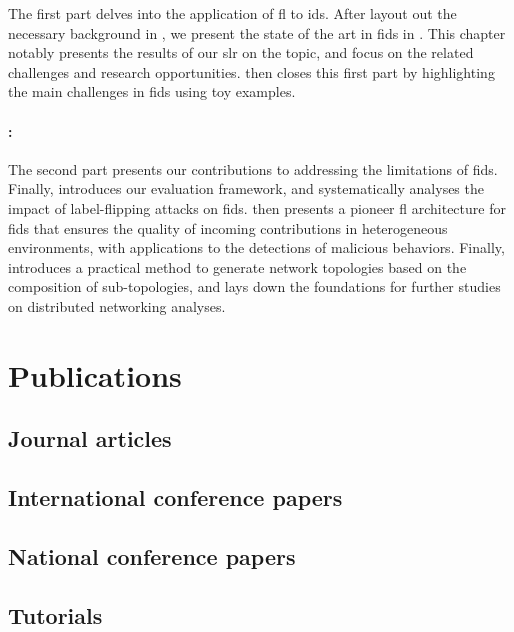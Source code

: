 The first part delves into the application of \gls{fl} to \gls{ids}.
After layout out the necessary background in , we present the state of the art in \gls{fids} in .
This chapter notably presents the results of our \gls{slr} on the topic, and focus on the related challenges and research opportunities.
 then closes this first part by highlighting the main challenges in \gls{fids} using toy examples.

\paragraph{:}

The second part presents our contributions to addressing the limitations of \gls{fids}.
Finally,  introduces our evaluation framework, and systematically analyses the impact of label-flipping attacks on \gls{fids}.
 then presents a pioneer \gls{fl} architecture for \gls{fids} that ensures the quality of incoming contributions in heterogeneous environments, with applications to the detections of malicious behaviors.
Finally,  introduces a practical method to generate network topologies based on the composition of sub-topologies, and lays down the foundations for further studies on distributed networking analyses.


\section{Publications\label{sec:intro.publications}}

\makeatletter
\newcommand\Setmaxbibnames[1]{\renewcommand\blx@maxbibnames{#1}}
\makeatletter

\begin{refsection}
  \begin{refcontext}[sorting=ymdnt]
    \Setmaxbibnames{99}
    \nocite{*}
    \subsection*{Journal articles}
    \printbibliography[heading=none,type=article]
    \subsection*{International conference papers}
    \printbibliography[heading=none,type=inproceedings,keyword=confs]
    \subsection*{National conference papers}
    \printbibliography[heading=none,type=inproceedings,keyword=national]
    \subsection*{Tutorials}
    \printbibliography[heading=none,keyword=tutorial]
  \end{refcontext}
\end{refsection}